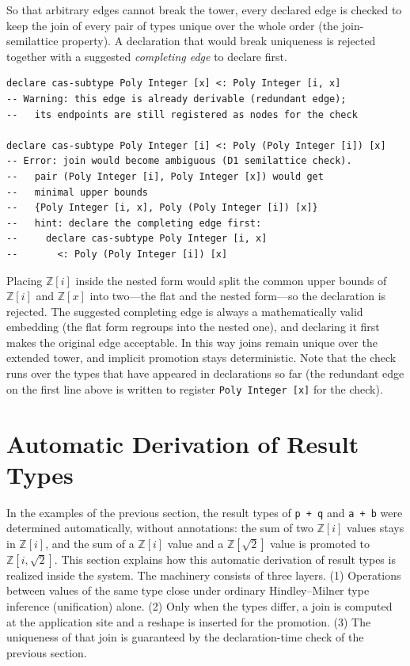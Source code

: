 So that arbitrary edges cannot break the tower, every declared edge is checked to keep the join of every pair of types unique over the whole order (the join-semilattice property).
A declaration that would break uniqueness is rejected together with a suggested \emph{completing edge} to declare first.
\begin{lstlisting}[language=egison,numbers=none]
declare cas-subtype Poly Integer [x] <: Poly Integer [i, x]
-- Warning: this edge is already derivable (redundant edge);
--   its endpoints are still registered as nodes for the check

declare cas-subtype Poly Integer [i] <: Poly (Poly Integer [i]) [x]
-- Error: join would become ambiguous (D1 semilattice check).
--   pair (Poly Integer [i], Poly Integer [x]) would get
--   minimal upper bounds
--   {Poly Integer [i, x], Poly (Poly Integer [i]) [x]}
--   hint: declare the completing edge first:
--     declare cas-subtype Poly Integer [i, x]
--       <: Poly (Poly Integer [i]) [x]
\end{lstlisting}
Placing $\mathbb{Z}[i]$ inside the nested form would split the common upper bounds of $\mathbb{Z}[i]$ and $\mathbb{Z}[x]$ into two---the flat and the nested form---so the declaration is rejected.
The suggested completing edge is always a mathematically valid embedding (the flat form regroups into the nested one), and declaring it first makes the original edge acceptable.
In this way joins remain unique over the extended tower, and implicit promotion stays deterministic.
Note that the check runs over the types that have appeared in declarations so far (the redundant edge on the first line above is written to register \lstinline{Poly Integer [x]} for the check).

\section{Automatic Derivation of Result Types}\label{cas-join}

In the examples of the previous section, the result types of \lstinline{p + q} and \lstinline{a + b} were determined automatically, without annotations: the sum of two $\mathbb{Z}[i]$ values stays in $\mathbb{Z}[i]$, and the sum of a $\mathbb{Z}[i]$ value and a $\mathbb{Z}[\sqrt{2}]$ value is promoted to $\mathbb{Z}[i, \sqrt{2}]$.
This section explains how this automatic derivation of result types is realized inside the system.
The machinery consists of three layers.
(1) Operations between values of the same type close under ordinary Hindley--Milner type inference (unification) alone.
(2) Only when the types differ, a join is computed at the application site and a reshape is inserted for the promotion.
(3) The uniqueness of that join is guaranteed by the declaration-time check of the previous section.

